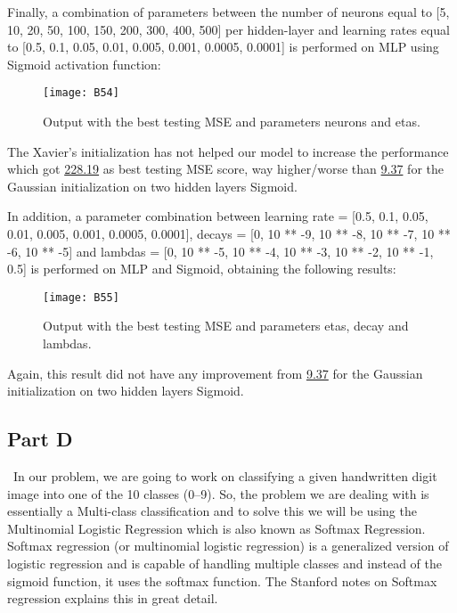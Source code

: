 Finally, a combination of parameters between the number of neurons equal to [5, 10, 20, 50, 100, 150, 200, 300, 400, 500] per hidden-layer and learning rates equal to [0.5, 0.1, 0.05, 0.01, 0.005, 0.001, 0.0005, 0.0001] is performed on MLP using Sigmoid activation function:

\begin{figure}[H]
\label{fig:B32}
\centering
\texttt{[image: B54]}
\caption{Output with the best testing MSE and parameters neurons and etas.}
\end{figure}

The Xavier's initialization has not helped our model to increase the performance which got \hyperref[fig:B23]{228.19} as best testing MSE score, way higher/worse than \hyperref[fig:B10]{9.37} for the Gaussian initialization on two hidden layers Sigmoid. 

In addition, a parameter combination between learning rate = [0.5, 0.1, 0.05, 0.01, 0.005, 0.001, 0.0005, 0.0001], decays = [0, 10 ** -9, 10 ** -8, 10 ** -7, 10 ** -6, 10 ** -5] and lambdas = [0, 10 ** -5, 10 ** -4, 10 ** -3, 10 ** -2, 10 ** -1, 0.5] is performed on MLP and Sigmoid, obtaining the following results:

\begin{figure}[H]
\label{fig:B33}
\centering
\texttt{[image: B55]}
\caption{Output with the best testing MSE and parameters etas, decay and lambdas.}
\end{figure}

Again, this result did not have any improvement from \hyperref[fig:B10]{9.37} for the Gaussian initialization on two hidden layers Sigmoid.

\subsection{Part D}
\label{chap:Part D}

\quad \, In our problem, we are going to work on classifying a given handwritten digit image into one of the 10 classes (0–9). So, the problem we are dealing with is essentially a Multi-class classification and to solve this we will be using the Multinomial Logistic Regression which is also known as Softmax Regression.\\

Softmax regression (or multinomial logistic regression) is a generalized version of logistic regression and is capable of handling multiple classes and instead of the sigmoid function, it uses the softmax function. The Stanford notes on Softmax regression explains this in great detail.

